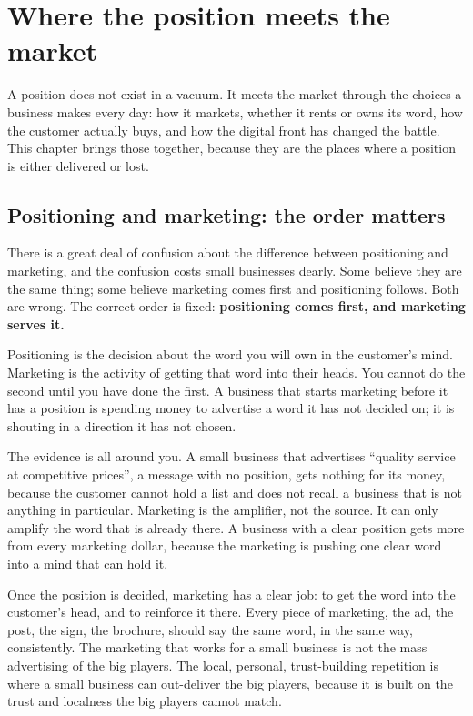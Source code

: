 \documentclass[10pt,twoside,openany]{memoir}
\newcommand{\needspacehead}{\needspace{4\baselineskip}}
\let\oldsection\section
\renewcommand{\section}{\needspacehead\oldsection}
\begin{document}
{\FloatBarrier
\chapter{Where the position meets the
market}\label{where-the-position-meets-the-market}

A position does not exist in a vacuum. It meets the market through the
choices a business makes every day: how it markets, whether it rents or
owns its word, how the customer actually buys, and how the digital front
has changed the battle. This chapter brings those together, because they
are the places where a position is either delivered or lost.

\section{Positioning and marketing: the order
matters}\label{positioning-and-marketing-the-order-matters}

There is a great deal of confusion about the difference between
positioning and marketing, and the confusion costs small businesses
dearly. Some believe they are the same thing; some believe marketing
comes first and positioning follows. Both are wrong. The correct order
is fixed: \textbf{positioning comes first, and marketing serves it.}

Positioning is the decision about the word you will own in the
customer's mind. Marketing is the activity of getting that word into
their heads. You cannot do the second until you have done the first. A
business that starts marketing before it has a position is spending
money to advertise a word it has not decided on; it is shouting in a
direction it has not chosen.

The evidence is all around you. A small business that advertises
``quality service at competitive prices'', a message with no position,
gets nothing for its money, because the customer cannot hold a list and
does not recall a business that is not anything in particular. Marketing
is the amplifier, not the source. It can only amplify the word that is
already there. A business with a clear position gets more from every
marketing dollar, because the marketing is pushing one clear word into a
mind that can hold it.

Once the position is decided, marketing has a clear job: to get the word
into the customer's head, and to reinforce it there. Every piece of
marketing, the ad, the post, the sign, the brochure, should say the same
word, in the same way, consistently. The marketing that works for a
small business is not the mass advertising of the big players. The
local, personal, trust-building repetition is where a small business can
out-deliver the big players, because it is built on the trust and
localness the big players cannot match.

}
\end{document}
